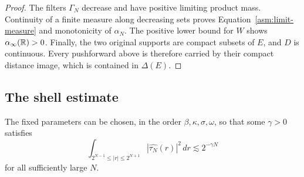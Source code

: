 \begin{proof}
The filters $\Gamma_N$ decrease and have positive limiting product
mass.  Continuity of a finite measure along decreasing sets proves
Equation~\eqref{asm:limit-measure} and monotonicity of $\alpha_N$.
The positive lower bound for $W$ shows
$\alpha_\infty(\mathbb R)>0$.  Finally, the two original supports are compact
subsets of $E$, and $D$ is continuous.  Every pushforward above is
therefore carried by their compact distance image, which is contained
in $\Delta(E)$.
\end{proof}

\subsection{The shell estimate}

\begin{proposition}
\label{asm:shell-decay}
The fixed parameters can be chosen, in the order
$\beta,\kappa,\sigma,\omega$, so that some $\gamma>0$ satisfies
\begin{equation}
 \label{asm:shell-bound}
 \int_{2^{N-1}\le |r|\le2^{N+1}}
                   |\widehat{\tau_N}(r)|^2\,dr
       \lesssim2^{-\gamma N}
\end{equation}
for all sufficiently large $N$.
\end{proposition}

